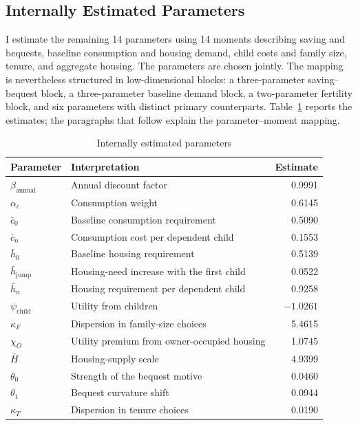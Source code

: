 \documentclass[11pt]{article}
\begin{document}
\subsection{Internally Estimated Parameters}

I estimate the remaining 14 parameters using 14 moments describing saving and
bequests, baseline consumption and housing demand, child costs and family size,
tenure, and aggregate housing. The parameters are chosen jointly. The mapping
is nevertheless structured in low-dimensional blocks: a three-parameter
saving--bequest block, a three-parameter baseline demand block, a
two-parameter fertility block, and six parameters with distinct primary
counterparts. Table~\ref{tab:quant_parameters} reports the estimates; the
paragraphs that follow explain the parameter--moment mapping.

\begin{table}[H]
\centering
\caption{Internally estimated parameters}
\label{tab:quant_parameters}
\small
\renewcommand{\arraystretch}{1.04}
\begin{tabularx}{0.84\textwidth}{@{}l X r@{}}
\toprule
Parameter & Interpretation & Estimate \\
\midrule
$\beta_{\mathrm{annual}}$ & Annual discount factor & 0.9991 \\
$\alpha_c$ & Consumption weight & 0.6145 \\
$\bar c_0$ & Baseline consumption requirement & 0.5090 \\
$\bar c_n$ & Consumption cost per dependent child & 0.1553 \\
$\bar h_0$ & Baseline housing requirement & 0.5139 \\
$\bar h_{\mathrm{jump}}$ & Housing-need increase with the first child & 0.0522 \\
$\bar h_n$ & Housing requirement per dependent child & 0.9258 \\
$\psi_{\mathrm{child}}$ & Utility from children & $-1.0261$ \\
$\kappa_F$ & Dispersion in family-size choices & 5.4615 \\
$\chi_O$ & Utility premium from owner-occupied housing & 1.0745 \\
$\bar H$ & Housing-supply scale & 4.9399 \\
$\theta_0$ & Strength of the bequest motive & 0.0460 \\
$\theta_1$ & Bequest curvature shift & 0.0944 \\
$\kappa_T$ & Dispersion in tenure choices & 0.0190 \\
\bottomrule
\end{tabularx}
\end{table}
\end{document}
